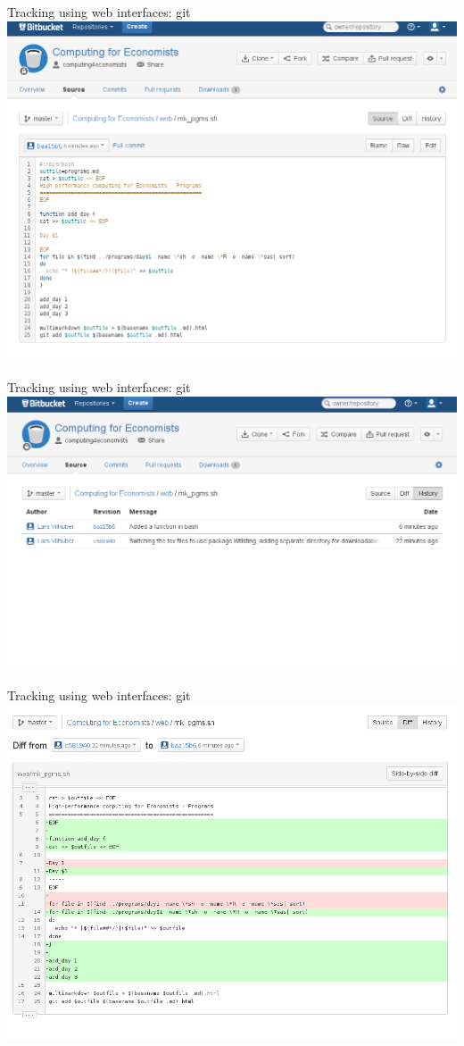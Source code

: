 \documentclass[xcolor=table,compress]{beamer}
\begin{document}
\begin{frame}{Tracking using web interfaces: git}
\includegraphics[width=.9\textwidth]{git-view1.png}
\end{frame}

\begin{frame}{Tracking using web interfaces: git}
\includegraphics[width=.9\textwidth]{git-view2.png}
\end{frame}

\begin{frame}{Tracking using web interfaces: git}
\includegraphics[width=.9\textwidth]{git-view3.png}
\end{frame}
\end{document}
